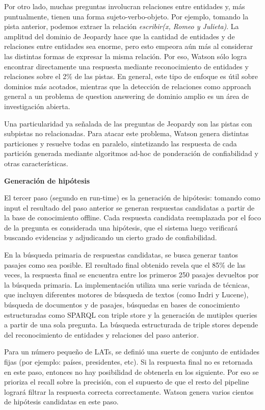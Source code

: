 Por otro lado, muchas preguntas involucran relaciones entre entidades y,
más puntualmente, tienen una forma sujeto-verbo-objeto. Por ejemplo,
tomando la pista anterior, podemos extraer la relación
\textit{escribir(x, Romeo y Julieta)}. La amplitud del dominio de
Jeopardy hace que la cantidad de entidades y de relaciones entre
entidades sea enorme, pero esto empeora aún más al considerar las
distintas formas de expresar la misma relación. Por eso, Watson
sólo logra encontrar directamente una respuesta mediante
reconocimiento de entidades y relaciones sobre el 2\% de las pistas. En
general, este tipo de enfoque es útil sobre dominios más acotados,
mientras que la detección de relaciones como approach general a un
problema de question answering de dominio amplio es un área de
investigación abierta. 

Una particularidad ya señalada de las preguntas de Jeopardy son las
pistas con subpistas no relacionadas. Para atacar este problema, Watson
genera distintas particiones y resuelve todas en paralelo, sintetizando
las respuesta de cada partición generada mediante algoritmos ad-hoc
de ponderación de confiabilidad y otras características. \newline 

\textbf{Generación de hipótesis}\newline

El tercer paso (segundo en run-time) es la generación de hipótesis:
tomando como input el resultado del paso anterior se generan respuestas
candidatas a partir de la base de conocimiento offline. Cada respuesta
candidata reemplazada por el foco de la pregunta es considerada una
hipótesis, que el sistema luego verificará buscando evidencias y
adjudicando un cierto grado de confiabilidad.

En la búsqueda primaria de respuestas candidatas, se busca generar
tantos pasajes como sea posible. El resultado final obtenido revela que
el 85\% de las veces, la respuesta final se encuentra entre los
primeros 250 pasajes devueltos por la búsqueda primaria. La
implementación utiliza una serie variada de técnicas, que incluyen
diferentes motores de búsqueda de textos (como Indri y Lucene),
búsqueda de documentos y de pasajes, búsquedas en bases de
conocimiento estructuradas como SPARQL con triple store y la
generación de mutiples queries a partir de una sola pregunta. La
búsqueda estructurada de triple stores depende del reconocimiento de
entidades y relaciones del paso anterior.

Para un número pequeño de LATs, se definió una suerte de conjunto
de entidades fijas (por ejemplo: países, presidentes, etc). Si la
respuesta final no es retornada en este paso, entonces no hay
posibilidad de obtenerla en los siguiente. Por eso se prioriza el
recall sobre la precisión, con el supuesto de que el resto del
pipeline logrará filtrar la respuesta correcta correctamente. Watson
genera varios cientos de hipótesis candidatas en este paso. \newline 

